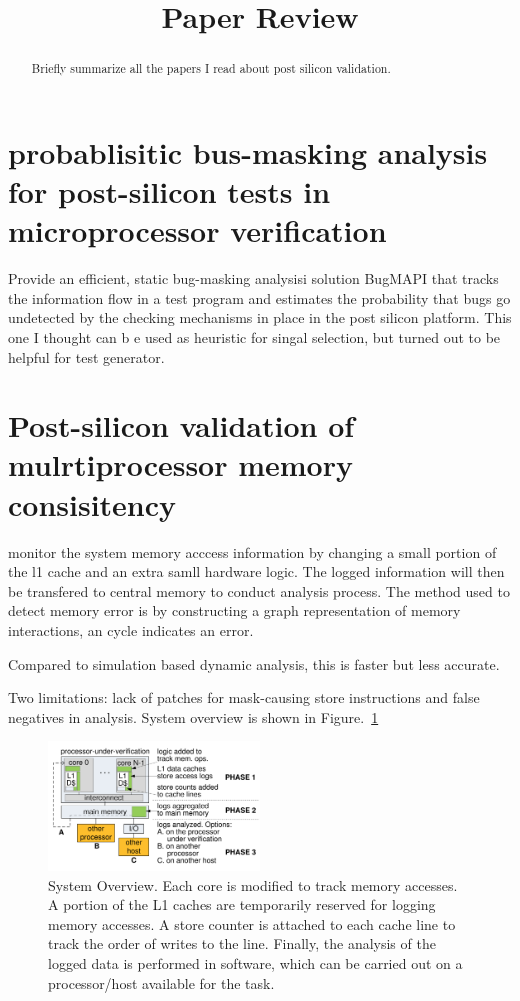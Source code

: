 \documentclass[conference]{IEEEtran}
\begin{document}
\title{Paper Review}

\author{
}
\maketitle


\begin{abstract}
Briefly summarize all the papers I read about post silicon validation.
\end{abstract}


\section{probablisitic bus-masking analysis for post-silicon tests in microprocessor verification}
Provide an efficient, static bug-masking analysisi solution BugMAPI that tracks the information flow in a 
test program and estimates the probability that bugs go undetected by the checking mechanisms in place
in the post silicon platform.
This one I thought can b e used as heuristic for singal selection, but turned out to be helpful for test generator.

\section{Post-silicon validation of mulrtiprocessor memory consisitency~\cite{mammo2015post}}
monitor the system memory acccess information by changing a small portion of the l1 cache and an extra samll hardware logic.
The logged information will then be transfered to central memory to conduct analysis process.
The method used to detect memory error is by constructing a graph representation of memory interactions, an cycle indicates an error.

Compared to simulation based dynamic analysis, this is faster but less accurate.

Two limitations: lack of patches for mask-causing store instructions and false negatives in analysis.
System overview is shown in Figure.~\ref{systemoverview}
\begin{figure}
\includegraphics[width=0.5\textwidth]{systemoverview.png}
\caption{System Overview. Each core is modified to track memory accesses.
A portion of the L1 caches are temporarily reserved for logging memory accesses. A store counter is attached to each cache line to track the order of writes to the line. Finally, the analysis of the logged data is performed in software, which can be carried out on a processor/host available for the task.}
\label{systemoverview}
\end{figure}
\end{document}
